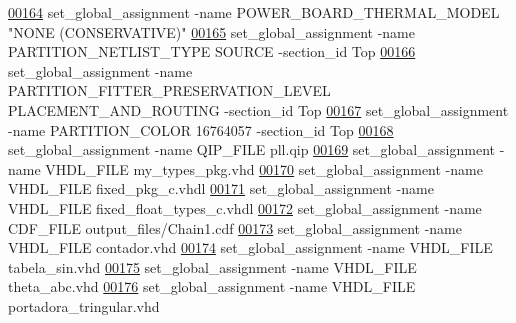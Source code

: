\begin{DoxyCode}
\hypertarget{_d_e0___n_a_n_o___v_f_8qsf_source_l00164}{}\hyperlink{_d_e0___n_a_n_o___v_f_8qsf_a448248c4a58578f75db462bf3eb14aab}{00164} set\_global\_assignment -name POWER\_BOARD\_THERMAL\_MODEL "NONE (CONSERVATIVE)"
\hypertarget{_d_e0___n_a_n_o___v_f_8qsf_source_l00165}{}\hyperlink{_d_e0___n_a_n_o___v_f_8qsf_aabc59314d1a057c3b5a7b52bc92041d9}{00165} set\_global\_assignment -name PARTITION\_NETLIST\_TYPE SOURCE -section\_id Top
\hypertarget{_d_e0___n_a_n_o___v_f_8qsf_source_l00166}{}\hyperlink{_d_e0___n_a_n_o___v_f_8qsf_a32439c0cb466f1e087721048405f8221}{00166} set\_global\_assignment -name PARTITION\_FITTER\_PRESERVATION\_LEVEL PLACEMENT\_AND\_ROUTING -section\_id Top
\hypertarget{_d_e0___n_a_n_o___v_f_8qsf_source_l00167}{}\hyperlink{_d_e0___n_a_n_o___v_f_8qsf_a3d96d8db31443ed0dee438cee7b0ba8c}{00167} set\_global\_assignment -name PARTITION\_COLOR \textcolor{vhdllogic}{16764057} -section\_id Top
\hypertarget{_d_e0___n_a_n_o___v_f_8qsf_source_l00168}{}\hyperlink{_d_e0___n_a_n_o___v_f_8qsf_a42c036f7dc9bf25ac6352832625579f9}{00168} set\_global\_assignment -name QIP\_FILE pll.qip
\hypertarget{_d_e0___n_a_n_o___v_f_8qsf_source_l00169}{}\hyperlink{_d_e0___n_a_n_o___v_f_8qsf_a461ac1f66632f8729bf15b8660f7e07e}{00169} set\_global\_assignment -name VHDL\_FILE my\_types\_pkg.vhd
\hypertarget{_d_e0___n_a_n_o___v_f_8qsf_source_l00170}{}\hyperlink{_d_e0___n_a_n_o___v_f_8qsf_a5d3721b435da4be0348a9324ddc7d8c0}{00170} set\_global\_assignment -name VHDL\_FILE fixed\_pkg\_c.vhdl
\hypertarget{_d_e0___n_a_n_o___v_f_8qsf_source_l00171}{}\hyperlink{_d_e0___n_a_n_o___v_f_8qsf_abefe3c6bc16980ce54778dd579ba42c9}{00171} set\_global\_assignment -name VHDL\_FILE fixed\_float\_types\_c.vhdl
\hypertarget{_d_e0___n_a_n_o___v_f_8qsf_source_l00172}{}\hyperlink{_d_e0___n_a_n_o___v_f_8qsf_a407c66e36d02ca6a228802badab8bcce}{00172} set\_global\_assignment -name CDF\_FILE output\_files/Chain1.cdf
\hypertarget{_d_e0___n_a_n_o___v_f_8qsf_source_l00173}{}\hyperlink{_d_e0___n_a_n_o___v_f_8qsf_a8b05d656791b87aca7eba6637f765c99}{00173} set\_global\_assignment -name VHDL\_FILE contador.vhd
\hypertarget{_d_e0___n_a_n_o___v_f_8qsf_source_l00174}{}\hyperlink{_d_e0___n_a_n_o___v_f_8qsf_a3ce82377938da50d565087c98da82aed}{00174} set\_global\_assignment -name VHDL\_FILE tabela\_sin.vhd
\hypertarget{_d_e0___n_a_n_o___v_f_8qsf_source_l00175}{}\hyperlink{_d_e0___n_a_n_o___v_f_8qsf_a15c94ebc7d728860be7c411de20d4147}{00175} set\_global\_assignment -name VHDL\_FILE theta\_abc.vhd
\hypertarget{_d_e0___n_a_n_o___v_f_8qsf_source_l00176}{}\hyperlink{_d_e0___n_a_n_o___v_f_8qsf_aa30d06e793a65909e96b56e389170068}{00176} set\_global\_assignment -name VHDL\_FILE portadora\_tringular.vhd

\end{DoxyCode}
